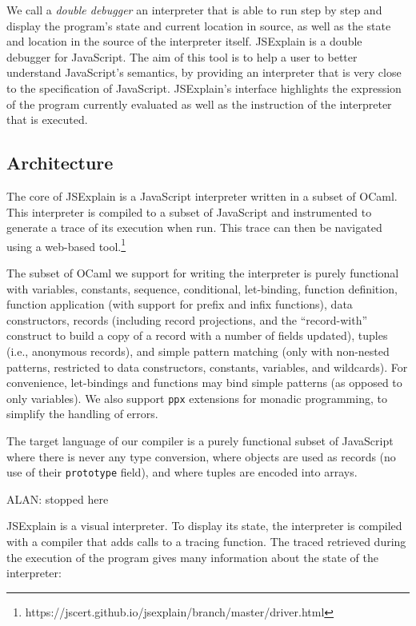 \documentclass[twocolumn]{article}
\begin{document}
We call a \emph{double debugger} an interpreter that is able to run step by step
and display the program's state and current location in source, as well as the
state and location in the source of the interpreter itself. JSExplain is a
double debugger for JavaScript. The aim of this tool is to help a user to better
understand JavaScript's semantics, by providing an interpreter that is very
close to the specification of JavaScript. JSExplain's interface highlights the
expression of the program currently evaluated as well as the instruction of the
interpreter that is executed.

\subsection{Architecture}

The core of JSExplain is a JavaScript interpreter written in a subset of OCaml.
This interpreter is compiled to a subset of JavaScript and instrumented to
generate a trace of its execution when run. This trace can then be navigated
using a web-based
tool.\footnote{https://jscert.github.io/jsexplain/branch/master/driver.html}

The subset of OCaml we support for writing the interpreter is purely functional
with variables, constants, sequence, conditional, let-binding, function
definition, function application (with support for prefix and infix functions),
data constructors, records (including record projections, and the
``record-with'' construct to build a copy of a record with a number of fields
updated), tuples (i.e., anonymous records), and simple pattern matching (only
with non-nested patterns, restricted to data constructors, constants, variables,
and wildcards). For convenience, let-bindings and functions may bind simple
patterns (as opposed to only variables). We also support \texttt{ppx} extensions
for monadic programming, to simplify the handling of errors.

The target language of our compiler is a purely functional subset of JavaScript
where there is never any type conversion, where objects are used as records (no
use of their \texttt{prototype} field), and where tuples are encoded into
arrays.

ALAN: stopped here

JSExplain is a visual interpreter. To display its state, the interpreter is
compiled with a compiler that adds calls to a tracing function. The traced
retrieved during the execution of the program gives many information about the
state of the interpreter:
\end{document}
